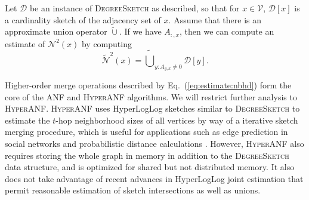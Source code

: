 \documentclass{report}
\newcommand{\algoname}[1]{\textnormal{\textsc{#1}}}
\begin{document}
Let $\mathcal{D}$ be an instance of \algoname{DegreeSketch} as described, so that for $x \in \mathcal{V}$, $\mathcal{D}[x]$ is a cardinality sketch of the adjacency set of $x$.
Assume that there is an approximate union operator $\widetilde{\cup}$.
If we have $A_{:,x}$, then we can compute an estimate of $\mathcal{N}^2(x)$ by computing 
%
\begin{equation} \label{eq:estimate:nbhd}
	\widetilde{\mathcal{N}}^2(x) 
	= \widetilde{\bigcup}_{y: A_{y,x} \neq 0} \mathcal{D}[y].
\end{equation}
%

Higher-order merge operations described by Eq.~(\ref{eq:estimate:nbhd}) form the core of the \algoname{ANF} \cite{palmer2002anf} and \algoname{HyperANF} \cite{boldi2011hyperanf} algorithms.
We will restrict further analysis to \algoname{HyperANF}.
\algoname{HyperANF} uses HyperLogLog sketches similar to \algoname{DegreeSketch} to estimate the $t$-hop neighborhood sizes of all vertices by way of a iterative sketch merging procedure, which is useful for applications such as edge prediction in social networks \cite{gupta2013wtf} and probabilistic distance calculations \cite{boldi2011hyperanf, myers2014information}.
However, \algoname{HyperANF} also requires storing the whole graph in memory in addition to the \algoname{DegreeSketch} data structure, and is optimized for shared but not distributed memory. 
It also does not take advantage of recent advances in HyperLogLog joint estimation that permit reasonable estimation of sketch intersections as well as unions.
\end{document}
